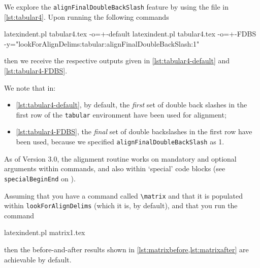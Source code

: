  \begin{example}
 We explore the \texttt{alignFinalDoubleBackSlash} feature by using the file in
 \cref{lst:tabular4}. Upon running the following commands   %

 \begin{commandshell}
latexindent.pl tabular4.tex -o=+-default
latexindent.pl tabular4.tex -o=+-FDBS -y="lookForAlignDelims:tabular:alignFinalDoubleBackSlash:1"
\end{commandshell}

 then we receive the respective outputs given in \cref{lst:tabular4-default} and
 \cref{lst:tabular4-FDBS}.

 \begin{cmhtcbraster}[raster columns=3,
   raster left skip=-3.75cm,
   raster right skip=-2cm,]
 \end{cmhtcbraster}

 We note that in:
 \begin{itemize}
  \item \cref{lst:tabular4-default}, by default, the \emph{first} set of double back
        slashes in the first row of the \texttt{tabular} environment have been used for
        alignment;
  \item \cref{lst:tabular4-FDBS}, the \emph{final} set of double backslashes in the
        first row have been used, because we specified \texttt{alignFinalDoubleBackSlash} as 1.
 \end{itemize}
 \end{example}

 As of Version 3.0, the alignment routine works on mandatory and optional arguments
 within commands, and also within `special' code blocks (see \texttt{specialBeginEnd} on
 ).

 \begin{example}
 Assuming that you have a command called \lstinline!\matrix! and that it is populated
 within \texttt{lookForAlignDelims} (which it is, by default), and that you run the
 command

 \begin{commandshell}
latexindent.pl matrix1.tex 
\end{commandshell}

 then the before-and-after results shown in \cref{lst:matrixbefore,lst:matrixafter} are
 achievable by default.

 \begin{cmhtcbraster}
 \end{cmhtcbraster}
 \end{example}

